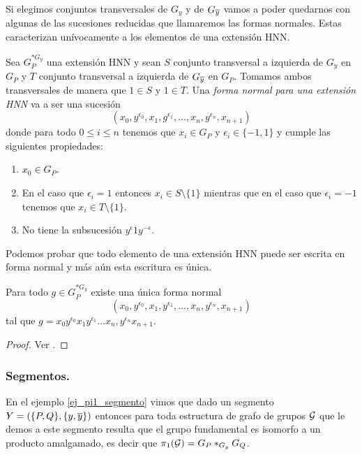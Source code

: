 \documentclass[tesis.tex]{subfiles}
\begin{document}
Si elegimos conjuntos transversales de $G_{y}$ y de $G_{\overline y}$ vamos a poder 
quedarnos con algunas de las sucesiones reducidas que llamaremos las formas normales.
Estas caracterizan unívocamente a los elementos de una extensión HNN.

\begin{deff}
	Sea $G_P^{\ast G_y}$ una extensión HNN  y sean $S$ conjunto transversal a izquierda de $G_y$ en $G_P$ y $T$ conjunto transversal a izquierda de $G_{\overline y}$ en $G_P$. 
	Tomamos ambos transversales de manera que $1 \in S$ y $1 \in T$.
	Una \emph{forma normal para una extensión HNN} va a ser una sucesión 
	\[
	(x_{0},y^{\epsilon_0},x_{1},g^{\epsilon_1}, \dots, x_{n},y^{\epsilon_n},x_{n+1})
	\]
	donde para todo $0 \le i \le n$ tenemos que $x_{i} \in G_{P}$ y $\epsilon_{i} \in \{ -1,1 \}$ y cumple las siguientes propiedades:
	\begin{enumerate}
		\item $x_0 \in G_P$.
		\item En el caso que $\epsilon_{i} = 1$ entonces $x_i \in S \setminus \{ 1\}$ mientras que en el caso que $\epsilon_{i} = -1$ tenemos que $x_{i} \in T \setminus \{ 1 \}$.
		\item No tiene la subsucesión $y^{\epsilon}1y^{-\epsilon}$.
	\end{enumerate}
\end{deff}

Podemos probar que todo elemento de una extensión HNN puede ser escrita en forma normal y más aún esta escritura es única.
 
\begin{teo}
	Para todo $g \in G_P^{\ast G_y}$ existe una única forma normal 
	\[
	(x_{0},y^{\epsilon_0},x_{1},y^{\epsilon_1}, \dots, x_{n},y^{\epsilon_n},x_{n+1})
	\]
	tal que $g = x_{0}y^{\epsilon_0}x_{1}y^{\epsilon_1} \dots x_{n},y^{\epsilon_n}x_{n+1}$.
\end{teo}
\begin{proof}
	Ver \cite[p.182]{lyndon1977combinatorial}.
\end{proof}


\subsubsection{Segmentos.}\label{subsub_segmento}

En el ejemplo \ref{ej_pi1_segmento} vimos que dado un segmento $Y = (\{P,Q\}, \{y, \overline y\}  )$ entonces para toda estructura de grafo de grupos ${\cal G}$ que le demos a este segmento
resulta que el grupo fundamental es isomorfo a un producto amalgamado, es decir que $\pi_1({\cal G}) = G_P \ast_{G_y} G_Q$. 
\end{document}
